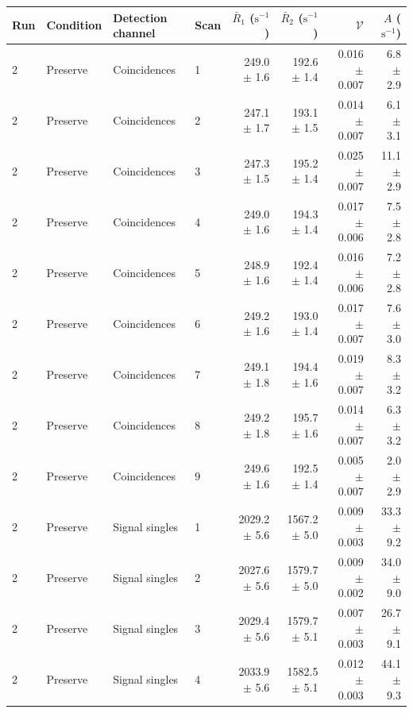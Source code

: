 \begin{tabular}{llllrrrr}
\toprule
Run & Condition & Detection channel & Scan & $\bar R_1$ ($\mathrm{s}^{-1}$) & $\bar R_2$ ($\mathrm{s}^{-1}$) & $\mathcal{V}$ & $A$ ($\mathrm{s}^{-1}$) \\
\midrule
2 & Preserve & Coincidences & 1 & 249.0 \ensuremath{\pm} 1.6 & 192.6 \ensuremath{\pm} 1.4 & 0.016 \ensuremath{\pm} 0.007 & 6.8 \ensuremath{\pm} 2.9 \\
2 & Preserve & Coincidences & 2 & 247.1 \ensuremath{\pm} 1.7 & 193.1 \ensuremath{\pm} 1.5 & 0.014 \ensuremath{\pm} 0.007 & 6.1 \ensuremath{\pm} 3.1 \\
2 & Preserve & Coincidences & 3 & 247.3 \ensuremath{\pm} 1.5 & 195.2 \ensuremath{\pm} 1.4 & 0.025 \ensuremath{\pm} 0.007 & 11.1 \ensuremath{\pm} 2.9 \\
2 & Preserve & Coincidences & 4 & 249.0 \ensuremath{\pm} 1.6 & 194.3 \ensuremath{\pm} 1.4 & 0.017 \ensuremath{\pm} 0.006 & 7.5 \ensuremath{\pm} 2.8 \\
2 & Preserve & Coincidences & 5 & 248.9 \ensuremath{\pm} 1.6 & 192.4 \ensuremath{\pm} 1.4 & 0.016 \ensuremath{\pm} 0.006 & 7.2 \ensuremath{\pm} 2.8 \\
2 & Preserve & Coincidences & 6 & 249.2 \ensuremath{\pm} 1.6 & 193.0 \ensuremath{\pm} 1.4 & 0.017 \ensuremath{\pm} 0.007 & 7.6 \ensuremath{\pm} 3.0 \\
2 & Preserve & Coincidences & 7 & 249.1 \ensuremath{\pm} 1.8 & 194.4 \ensuremath{\pm} 1.6 & 0.019 \ensuremath{\pm} 0.007 & 8.3 \ensuremath{\pm} 3.2 \\
2 & Preserve & Coincidences & 8 & 249.2 \ensuremath{\pm} 1.8 & 195.7 \ensuremath{\pm} 1.6 & 0.014 \ensuremath{\pm} 0.007 & 6.3 \ensuremath{\pm} 3.2 \\
2 & Preserve & Coincidences & 9 & 249.6 \ensuremath{\pm} 1.6 & 192.5 \ensuremath{\pm} 1.4 & 0.005 \ensuremath{\pm} 0.007 & 2.0 \ensuremath{\pm} 2.9 \\
\midrule
2 & Preserve & Signal singles & 1 & 2029.2 \ensuremath{\pm} 5.6 & 1567.2 \ensuremath{\pm} 5.0 & 0.009 \ensuremath{\pm} 0.003 & 33.3 \ensuremath{\pm} 9.2 \\
2 & Preserve & Signal singles & 2 & 2027.6 \ensuremath{\pm} 5.6 & 1579.7 \ensuremath{\pm} 5.0 & 0.009 \ensuremath{\pm} 0.002 & 34.0 \ensuremath{\pm} 9.0 \\
2 & Preserve & Signal singles & 3 & 2029.4 \ensuremath{\pm} 5.6 & 1579.7 \ensuremath{\pm} 5.1 & 0.007 \ensuremath{\pm} 0.003 & 26.7 \ensuremath{\pm} 9.1 \\
2 & Preserve & Signal singles & 4 & 2033.9 \ensuremath{\pm} 5.6 & 1582.5 \ensuremath{\pm} 5.1 & 0.012 \ensuremath{\pm} 0.003 & 44.1 \ensuremath{\pm} 9.3 \\

\end{tabular}
